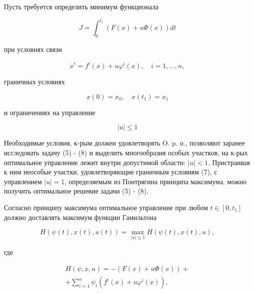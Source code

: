 \documentclass[10pt]{article}
\begin{document}
Пусть требуется определить минимум функционала



\[

J=\int_{0}^{t_{1}}(F(x)+u \Phi(x)) d t

\]



при условиях связи



\[

\dot{x}^{i}=f^{i}(x)+u \varphi^{i}(x), \quad i=1, \ldots, n,

\]



граничных условиях



\[

x(0)=x_{0}, \quad x\left(t_{1}\right)=x_{1}

\]



и ограничениях на управление



\[

|u| \leqslant 1

\]



Необходимые условия, к-рым должен удовлетворять O. p. о., позволяют заранее исследовать задачу (5) - (8) и выделить многообразия особых участков, на к-рых оптимальное управление лежит внутри допустимой области: $|u|<1$. Пристраивая к ним неособые участки, удовлетворяющие граничным условиям (7), с управлением $|u|=1$, определяемым из Понтрягина принципа максимума, можно получить оптимальное решевие задачи (5) - (8).



Согласно принципу максимума оптимальное управление при любом $t \in\left[0, t_{1}\right]$ должно доставлять максимум функции Гамильтона



\[

H(\psi(t), x(t), u(t))=\max _{|u| \leqslant 1} H(\psi(t), x(t), u),

\]



где



\[

\begin{gathered}

H(\psi, x, u)=-(F(x)+u \Phi(x))+ \\

+\sum_{i=1}^{n} \psi_{i}\left(f^{i}(x)+u \varphi^{i}(x)\right),

\end{gathered}

\]
\end{document}
